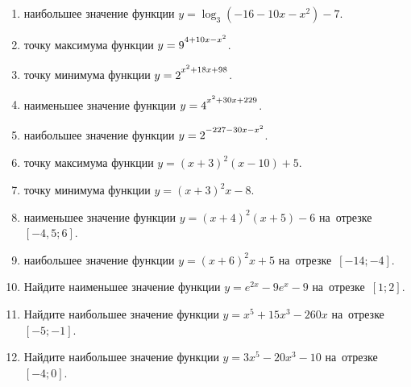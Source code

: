 \documentclass[a4paper,10pt]{article}
\begin{document}
\begin{enumerate}
\item {} наибольшее значение функции $y=\log_3\left(-16-10x-x^2\right)-7$.

\item {} точку максимума функции $y=9\strut^{4+10x-x^2}$.

\item {} точку минимума функции $y=2\strut^{x^2+18x+98}$.

\item {} наименьшее значение функции $y=4\strut^{x^2+30x+229}$.

\item {} наибольшее значение функции $y=2\strut^{-227-30x-x^2}$.

\item {} точку максимума функции $y=\left(x+3\right)^2\left(x-10\right)+5$.

\item {} точку минимума функции $y=\left(x+3\right)^2x-8$.

\item {} наименьшее значение функции $y=\left(x+4\right)^2\left(x+5\right)-6$ на~отрезке~$\left[-4{,}5;6\right]$.

\item {} наибольшее значение функции $y=\left(x+6\right)^2x+5$ на~отрезке~$\left[-14;-4\right]$.

\item Найдите наименьшее значение функции $y=e^{2x}-9e^x-9$ на~отрезке~$\left[1;2\right]$.

\item Найдите наибольшее значение функции $y=x^5+15x^3-260x$ на~отрезке~$\left[-5;-1\right]$.

\item Найдите наибольшее значение функции $y=3x^5-20x^3-10$ на~отрезке~$\left[-4;0\right]$.

\end{enumerate}
\end{document}
